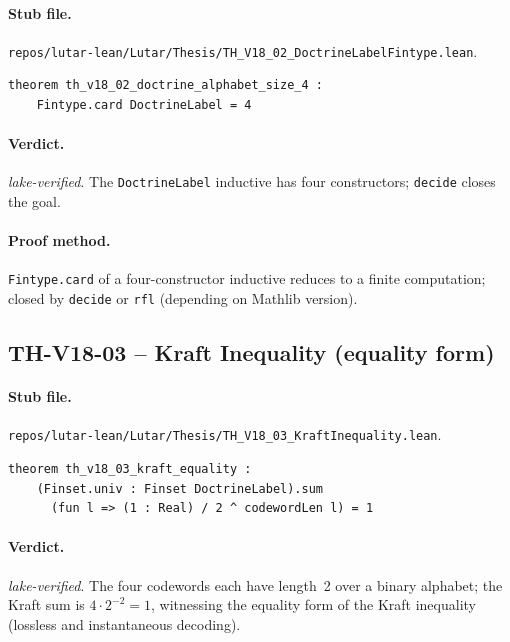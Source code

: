 \paragraph{Stub file.}
\texttt{repos/lutar-lean/Lutar/Thesis/TH\_V18\_02\_DoctrineLabelFintype.lean}.

\begin{theorem}
\label{thm:thv18-02}
\begin{verbatim}
theorem th_v18_02_doctrine_alphabet_size_4 :
    Fintype.card DoctrineLabel = 4
\end{verbatim}
\end{theorem}

\paragraph{Verdict.} \emph{lake-verified}. The \texttt{DoctrineLabel}
inductive has four constructors; \texttt{decide} closes the goal.

\paragraph{Proof method.} \texttt{Fintype.card} of a four-constructor
inductive reduces to a finite computation; closed by \texttt{decide}
or \texttt{rfl} (depending on Mathlib version).

\subsection{TH-V18-03 -- Kraft Inequality (equality form)}
\label{sub:thv18-03}

\paragraph{Stub file.}
\texttt{repos/lutar-lean/Lutar/Thesis/TH\_V18\_03\_KraftInequality.lean}.

\begin{theorem}
\label{thm:thv18-03}
\begin{verbatim}
theorem th_v18_03_kraft_equality :
    (Finset.univ : Finset DoctrineLabel).sum
      (fun l => (1 : Real) / 2 ^ codewordLen l) = 1
\end{verbatim}
\end{theorem}

\paragraph{Verdict.} \emph{lake-verified}. The four codewords each
have length~2 over a binary alphabet; the Kraft sum is
$4 \cdot 2^{-2} = 1$, witnessing the equality form of the Kraft
inequality (lossless and instantaneous decoding).


